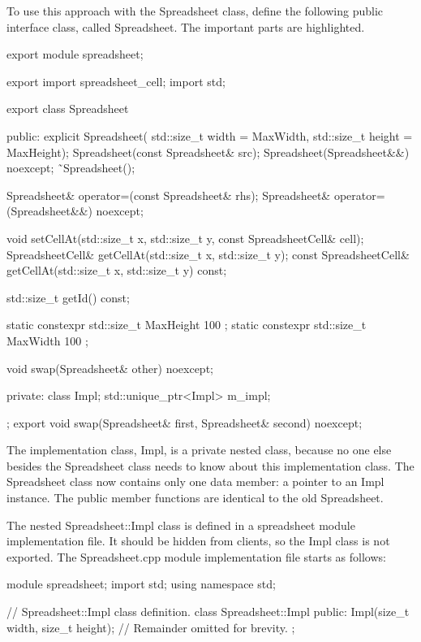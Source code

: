 To use this approach with the Spreadsheet class, define the following public interface class, called Spreadsheet. The important parts are highlighted.

\begin{cpp}
export module spreadsheet;

export import spreadsheet_cell;
import std;

export class Spreadsheet
{
    public:
        explicit Spreadsheet(
            std::size_t width = MaxWidth, std::size_t height = MaxHeight);
        Spreadsheet(const Spreadsheet& src);
        Spreadsheet(Spreadsheet&&) noexcept;
        ˜Spreadsheet();

        Spreadsheet& operator=(const Spreadsheet& rhs);
        Spreadsheet& operator=(Spreadsheet&&) noexcept;

        void setCellAt(std::size_t x, std::size_t y, const SpreadsheetCell& cell);
        SpreadsheetCell& getCellAt(std::size_t x, std::size_t y);
        const SpreadsheetCell& getCellAt(std::size_t x, std::size_t y) const;

        std::size_t getId() const;

        static constexpr std::size_t MaxHeight { 100 };
        static constexpr std::size_t MaxWidth { 100 };

        void swap(Spreadsheet& other) noexcept;

    private:
        class Impl;
        std::unique_ptr<Impl> m_impl;
};
export void swap(Spreadsheet& first, Spreadsheet& second) noexcept;
\end{cpp}

The implementation class, Impl, is a private nested class, because no one else besides the Spreadsheet class needs to know about this implementation class. The Spreadsheet class now contains only one data member: a pointer to an Impl instance. The public member functions are identical to the old Spreadsheet.

The nested Spreadsheet::Impl class is defined in a spreadsheet module implementation file. It should be hidden from clients, so the Impl class is not exported. The Spreadsheet.cpp module implementation file starts as follows:

\begin{cpp}
module spreadsheet;
import std;
using namespace std;

// Spreadsheet::Impl class definition.
class Spreadsheet::Impl
{
    public:
        Impl(size_t width, size_t height);
        // Remainder omitted for brevity.
};
\end{cpp}


